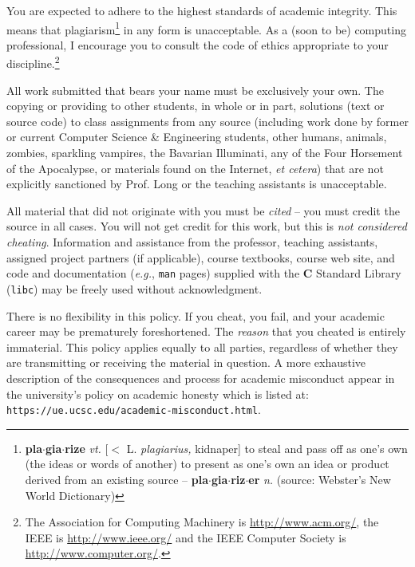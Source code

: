 \documentclass{article}
\begin{document}
You are expected to adhere to the highest standards of academic
integrity.
This means that plagiarism\footnote{{\bf pla$\cdot$gia$\cdot$rize} {\em vt.}
[$<$ L. {\em plagiarius,} kidnaper] to steal and pass off as one's own
(the ideas or words of another) to present as one's own an idea or product
derived from an existing source -- {\bf pla$\cdot$gia$\cdot$riz$\cdot$er}
{\em n.} (source: Webster's New World Dictionary)}
in any form is unacceptable.
As a (soon to be) computing
professional, I encourage you to consult the code of ethics
appropriate to your discipline.\footnote{The Association for Computing Machinery
is \url{http://www.acm.org/}, the IEEE is
\url{http://www.ieee.org/} and the IEEE Computer
Society is \url{http://www.computer.org/}.}

All work submitted that bears your name must be exclusively your own. 
The copying or providing to other students, in whole or in part,
solutions (text or source code) to class assignments from any source
(including work done by former or current Computer Science \& Engineering students,
other humans, animals, zombies, sparkling vampires, the Bavarian Illuminati,
any of the Four Horsement of the Apocalypse, or materials found
on the Internet, \emph{et cetera}) that are not explicitly sanctioned by
Prof.\xspace Long or the teaching assistants is unacceptable.

All material that did not originate with you must be \emph{cited}
-- you must credit the source in all cases. You will not get credit
for this work, but this is \emph{not considered cheating}. Information and 
assistance from the professor, teaching assistants, assigned project partners (if applicable), 
course textbooks, course web site, and code and documentation 
(\emph{e.g.}, \texttt{man} pages) supplied with the \textbf{C} Standard Library 
(\texttt{libc}) may be freely used without acknowledgment.

There is no flexibility in this policy. If you cheat, you fail, and
your academic career may be prematurely foreshortened. The
\emph{reason} that you cheated is entirely immaterial. This policy
applies equally to all parties, regardless of whether they are
transmitting or receiving the material in question. A more exhaustive description 
of the consequences and process for academic misconduct
appear in the university's policy on academic honesty which is listed at: \texttt{https://ue.ucsc.edu/academic-misconduct.html}. 

\end{document}
